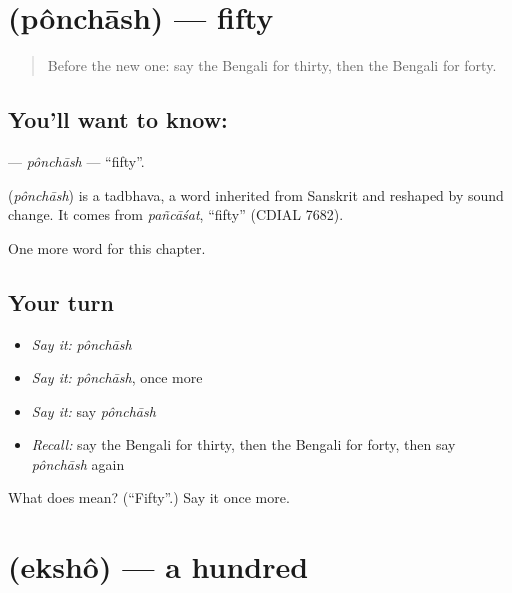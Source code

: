 \section[\texorpdfstring{\bn{পঞ্চাশ} (pônchāsh)}{পঞ্চাশ (pônchāsh)}]{ (pônchāsh) — fifty}

\label{lesson:BN-C87-ponchash}



\begin{quote}
Before the new one: say the Bengali for thirty, then the Bengali for forty.
\end{quote}

\subsection*{You'll want to know: }
\textbf{} — \emph{pônchāsh} — \textquotedblleft{}fifty\textquotedblright{}.

\begin{cousinweb}
\textbf{} (\emph{pônchāsh}) is a tadbhava, a word inherited from Sanskrit and reshaped by sound change. It comes from \emph{pañcāśat}, \textquotedblleft{}fifty\textquotedblright{} (CDIAL 7682).
\end{cousinweb}

\begin{grammarlens}[title={What you've built}]
One more word for this chapter.
\end{grammarlens}

\subsection*{Your turn}
\begin{itemize}
\raggedright
  \item \emph{Say it:} \emph{pônchāsh}
  \item \emph{Say it:} \emph{pônchāsh}, once more
  \item \emph{Say it:} say \emph{pônchāsh}
  \item \emph{Recall:} say the Bengali for thirty, then the Bengali for forty, then say \emph{pônchāsh} again
\end{itemize}

\begin{tcolorbox}[breakable,colback=teal!4,colframe=teal!35!black,title={Before you move on}]
What does  mean? (\textquotedblleft{}Fifty\textquotedblright{}.) Say it once more.
\end{tcolorbox}
\section[\texorpdfstring{\bn{একশো} (ekshô)}{একশো (ekshô)}]{ (ekshô) — a hundred}

